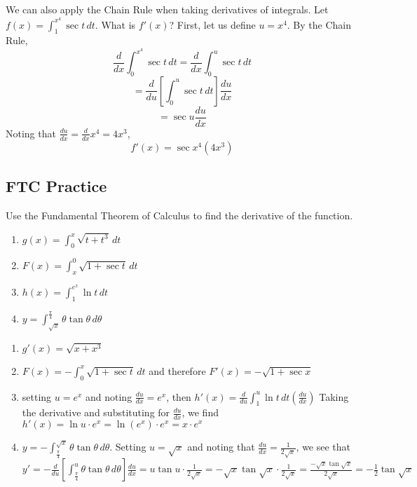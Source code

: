 We can also apply the Chain Rule when taking derivatives of integrals. 
Let $f(x) = \int_{1}^{x^4} \sec{t}\,dt$. What is $f'(x)$? First, let 
us define $u = x^4$. By the Chain Rule,
$$\frac{d}{dx}\int_{0}^{x^4} \sec{t}\,dt = \frac{d}{dx}\int_{0}^{u} \sec{t}\,dt$$ 
$$= \frac{d}{du}[\int_{0}^{u} \sec{t}\,dt]\frac{du}{dx}$$
$$ = \sec{u} \frac{du}{dx}$$
Noting that $\frac{du}{dx} = \frac{d}{dx}x^4 = 4x^3$, 
$$f'(x) = \sec{x^4}(4x^3)$$

\subsection{FTC Practice}
\begin{Exercise}[label=FTC1]
Use the Fundamental Theorem of Calculus to find the derivative of the function. 
	\begin{enumerate}
	\item $g(x) = \int_0^x \sqrt{t + t^3}\,dt$
	\item $F(x) = \int_x^0 \sqrt{1 + \sec{t}}\,dt$
	\item $h(x) = \int_1^{e^x} \ln{t}\,dt$
	\item $y = \int_{\sqrt{x}}^{\frac{\pi}{4}} \theta \tan{\theta}\,d\theta$
	\end{enumerate}
\end{Exercise}

\begin{Answer}[ref=FTC1]
	\begin{enumerate}
	\item $g'(x) = \sqrt{x + x^3}$
	\item $F(x) = - \int_0^x \sqrt{1+\sec{t}}\,dt$ and therefore $F'(x) = 
	- \sqrt{1+\sec{x}}$
	\item setting $u = e^x$ and noting $\frac{du}{dx} = e^x$, then $h'(x) 
	= \frac{d}{du}\int_1^{u} \ln{t}\,dt(\frac{du}{dx})$ Taking the 
	derivative and substituting for $\frac{du}{dx}$, we find $h'(x) = 
	\ln{u} \cdot e^x = \ln{(e^x)} \cdot e^x = x \cdot e^x$
	\item $y = - \int_{\frac{\pi}{4}}^{\sqrt{x}} \theta \tan{\theta}\,
	d\theta$. Setting $u = \sqrt{x}$ and noting that $\frac{du}{dx} = 
	\frac{1}{2\sqrt{x}}$, we see that $y' = -\frac{d}{du}
	[\int_{\frac{\pi}{4}}^{u}\theta\tan{\theta}\,d\theta]\frac{du}{dx} 
	= u\tan{u} \cdot \frac{1}{2\sqrt{x}} = -\sqrt{x}\tan{\sqrt{x}} \cdot 
	\frac{1}{2\sqrt{x}} = \frac{-\sqrt{x}\tan{\sqrt{x}}}{2\sqrt{x}} = 
	- \frac{1}{2}\tan{\sqrt{x}}$
	\end{enumerate}
\end{Answer}

